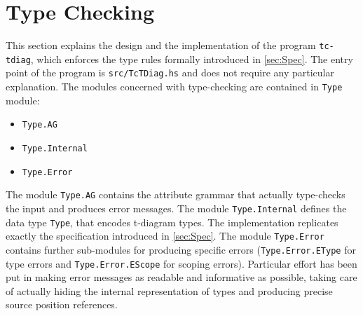 \documentclass[12pt, a4paper, twoside]{article}
\begin{document}
\section{Type Checking}
This section explains the design and the implementation of the program \texttt{tc-tdiag}, which 
enforces the type rules formally introduced in \ref{sec:Spec}.
The entry point of the program is \texttt{src/TcTDiag.hs} and does not require any particular
explanation.
The modules concerned with type-checking are contained in \texttt{Type} module:
\begin{itemize}
  \item \texttt{Type.AG}
  \item \texttt{Type.Internal}
  \item \texttt{Type.Error}
\end{itemize}
The module \texttt{Type.AG} contains the attribute grammar that actually type-checks the input 
and produces error messages.
The module \texttt{Type.Internal} defines the data type \texttt{Type}, that encodes t-diagram types.
The implementation replicates exactly the specification introduced in \ref{sec:Spec}.
The module \texttt{Type.Error} contains further sub-modules for producing specific errors 
(\texttt{Type.Error.EType} for type errors and \texttt{Type.Error.EScope} for scoping errors).
Particular effort has been put in making error messages as readable and informative as possible,
taking care of actually hiding the internal representation of types and producing precise source
position references.
\end{document}
